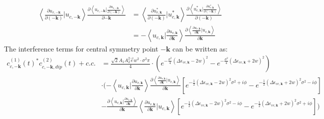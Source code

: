  \begin{align}
     \left \langle \frac{\partial u_{v,-\mathbf k}}{\partial (-\mathbf k)} |  u_{c,-\mathbf k} \right \rangle \frac{\partial{\left \langle u_{c,-\mathbf k}\Big |\frac{\partial u_{v,-\mathbf k}}{\partial (-\mathbf k)} \right \rangle}}{\partial {-\mathbf k}} 
     &=
     \left \langle \frac{\partial u_{v,\mathbf k}^*}{\partial (-\mathbf k)} |  u_{c,\mathbf k}^* \right \rangle \frac{\partial{\left \langle u_{c,\mathbf k}^*\Big |\frac{\partial u_{v,\mathbf k}^*}{\partial (-\mathbf k)} \right \rangle}}{\partial {(-\mathbf k)}} \\
     &=
     -\left \langle  u_{c,\mathbf k}| \frac{\partial u_{v,\mathbf k}}{\partial \mathbf k} \right \rangle 
     \frac{\partial{\left \langle \frac{\partial u_{v,\mathbf k}}{\partial \mathbf k} \Big |u_{c,\mathbf k} \right \rangle}}{\partial {\mathbf k}} 
 \end{align}
 The interference terms for central symmetry point $-\mathbf k$ can be written as:
\begin{equation}
\begin{aligned}
    c^{(1)}_{c,-\mathbf k}(t)^* c^{(2)}_{c,-\mathbf k,dip}(t) +c.c.&=\frac{\sqrt{2}A_1A_2^2 \vec e w^2 \cdot \sigma^2 \pi}{4}\cdot(e^{-\frac{\sigma^2}{4} (\Delta \epsilon_{vc,\mathbf k}-2w)^2}-e^{-\frac{\sigma^2}{4} (\Delta \epsilon_{vc,\mathbf k}+2w)^2})\\
    &\cdot (-\left \langle u_{c,\mathbf k} \big | \frac{\partial u_{v,\mathbf k}}{\partial \mathbf k}  \right \rangle \frac{\partial{\left \langle\frac{\partial u_{v,\mathbf k}}{\partial \mathbf k}\Big |u_{c,\mathbf k}\right \rangle}}{\partial {\mathbf k}}
    [e^{-\frac{1}{2}(\Delta \epsilon_{vc,\mathbf k} - 2w)^2 \sigma^2+i\phi}
    -e^{-\frac{1}{2}(\Delta \epsilon_{vc,\mathbf k} + 2w)^2 \sigma^2-i\phi}]\\
    &-\frac{\partial{\left \langle u_{c,\mathbf k}\Big |\frac{\partial u_{v,\mathbf k}}{\partial \mathbf k} \right \rangle}}{\partial {\mathbf k}}
    \left \langle \frac{\partial u_{v,\mathbf k}}{\partial \mathbf k} |  u_{c,\mathbf k} \right \rangle
     [e^{-\frac{1}{2}(\Delta \epsilon_{vc,\mathbf k} - 2w)^2 \sigma^2-i\phi}
    -e^{-\frac{1}{2}(\Delta \epsilon_{vc,\mathbf k} + 2w)^2 \sigma^2+i\phi}]
    )
\end{aligned}
\end{equation}

